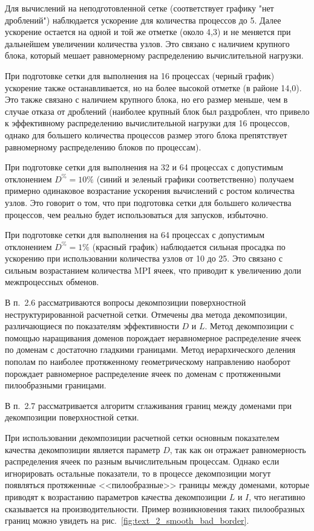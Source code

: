 \documentclass[a4paper,14pt]{extarticle}                     %
\theoremstyle{plain}                                         %
\begin{document}
Для вычислений на неподготовленной сетке (соответствует графику "нет дроблений") наблюдается ускорение для количества процессов до 5.
Далее ускорение остается на одной и той же отметке (около 4,3) и не меняется при дальнейшем увеличении количества узлов.
Это связано с наличием крупного блока, который мешает равномерному распределению вычислительной нагрузки.

При подготовке сетки для выполнения на 16 процессах (черный график) ускорение также останавливается, но на более высокой отметке (в районе 14,0).
Это также связано с наличием крупного блока, но его размер меньше, чем в случае отказа от дроблений (наиболее крупный блок был раздроблен, что привело к эффективному распределению вычислительной нагрузки для 16 процессов, однако для большего количества процессов размер этого блока препятствует равномерному распределению блоков по процессам).

При подготовке сетки для выполнения на 32 и 64 процессах с допустимым отклонением $D^{\%} = 10\%$ (синий и зеленый графики соответственно) получаем примерно одинаковое возрастание ускорения вычислений с ростом количества узлов.
Это говорит о том, что при подготовка сетки для большего количества процессов, чем реально будет использоваться для запусков, избыточно.

При подготовке сетки для выполнения на 64 процессах с допустимым отклонением $D^{\%} = 1\%$ (красный график) наблюдается сильная просадка по ускорению при использовании количества узлов от 10 до 25.
Это связано с сильным возрастанием количества MPI ячеек, что приводит к увеличению доли межпроцессных обменов.


В п.~2.6 рассматриваются вопросы декомпозиции поверхностной неструктурированной расчетной сетки.
Отмечены два метода декомпозиции, различающиеся по показателям эффективности $D$ и $L$.
Метод декомпозиции с помощью наращивания доменов порождает неравномерное распределение ячеек по доменам с достаточно гладкими границами.
Метод иерархического деления пополам по наиболее протяженному геометрическому направлению наоборот порождает равномерное распределение ячеек по доменам с протяженными пилообразными границами.


В п.~2.7 рассматривается алгоритм сглаживания границ между доменами при декомпозиции поверхностной сетки.

При использовании декомпозиции расчетной сетки основным показателем качества декомпозиции является параметр $D$, так как он отражает равномерность распределения ячеек по разным вычислительным процессам.
Однако если игнорировать остальные показатели, то в процессе декомпозиции могут появляться протяженные <<пилообразные>> границы между доменами, которые приводят к возрастанию параметров качества декомпозиции $L$ и $I$, что негативно сказывается на производительности.
Пример возникновения таких пилообразных границ можно увидеть на рис.~\ref{fig:text_2_smooth_bad_border}.
\end{document}

